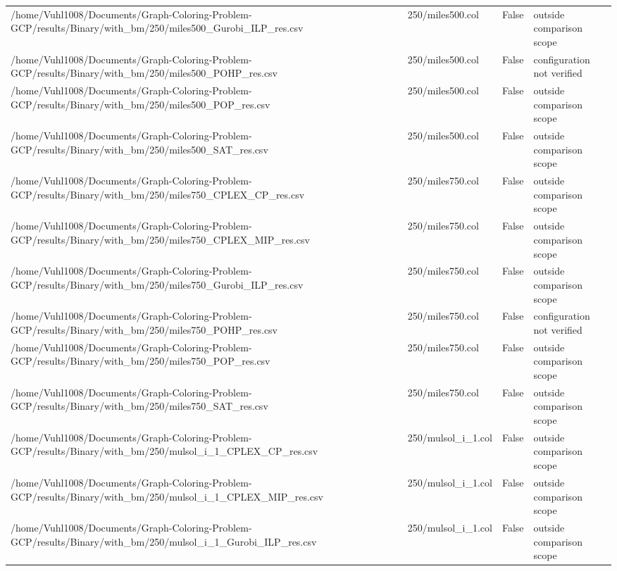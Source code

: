 \begin{table}[htbp]
\begin{tabular}{llll}
/home/Vuhl1008/Documents/Graph-Coloring-Problem-GCP/results/Binary/with\_bm/250/miles500\_Gurobi\_ILP\_res.csv & 250/miles500.col & False & outside comparison scope \\
/home/Vuhl1008/Documents/Graph-Coloring-Problem-GCP/results/Binary/with\_bm/250/miles500\_POHP\_res.csv & 250/miles500.col & False & configuration not verified \\
/home/Vuhl1008/Documents/Graph-Coloring-Problem-GCP/results/Binary/with\_bm/250/miles500\_POP\_res.csv & 250/miles500.col & False & outside comparison scope \\
/home/Vuhl1008/Documents/Graph-Coloring-Problem-GCP/results/Binary/with\_bm/250/miles500\_SAT\_res.csv & 250/miles500.col & False & outside comparison scope \\
/home/Vuhl1008/Documents/Graph-Coloring-Problem-GCP/results/Binary/with\_bm/250/miles750\_CPLEX\_CP\_res.csv & 250/miles750.col & False & outside comparison scope \\
/home/Vuhl1008/Documents/Graph-Coloring-Problem-GCP/results/Binary/with\_bm/250/miles750\_CPLEX\_MIP\_res.csv & 250/miles750.col & False & outside comparison scope \\
/home/Vuhl1008/Documents/Graph-Coloring-Problem-GCP/results/Binary/with\_bm/250/miles750\_Gurobi\_ILP\_res.csv & 250/miles750.col & False & outside comparison scope \\
/home/Vuhl1008/Documents/Graph-Coloring-Problem-GCP/results/Binary/with\_bm/250/miles750\_POHP\_res.csv & 250/miles750.col & False & configuration not verified \\
/home/Vuhl1008/Documents/Graph-Coloring-Problem-GCP/results/Binary/with\_bm/250/miles750\_POP\_res.csv & 250/miles750.col & False & outside comparison scope \\
/home/Vuhl1008/Documents/Graph-Coloring-Problem-GCP/results/Binary/with\_bm/250/miles750\_SAT\_res.csv & 250/miles750.col & False & outside comparison scope \\
/home/Vuhl1008/Documents/Graph-Coloring-Problem-GCP/results/Binary/with\_bm/250/mulsol\_i\_1\_CPLEX\_CP\_res.csv & 250/mulsol\_i\_1.col & False & outside comparison scope \\
/home/Vuhl1008/Documents/Graph-Coloring-Problem-GCP/results/Binary/with\_bm/250/mulsol\_i\_1\_CPLEX\_MIP\_res.csv & 250/mulsol\_i\_1.col & False & outside comparison scope \\
/home/Vuhl1008/Documents/Graph-Coloring-Problem-GCP/results/Binary/with\_bm/250/mulsol\_i\_1\_Gurobi\_ILP\_res.csv & 250/mulsol\_i\_1.col & False & outside comparison scope \\

\end{tabular}
\end{table}
